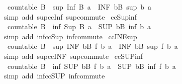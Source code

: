 \begin{isabellebody}
\ \ {\isachardoublequoteopen}countable\ B\ {\isasymLongrightarrow}\ sup\ {\isacharparenleft}Inf\ B{\isacharparenright}\ a\ {\isacharequal}\ {\isacharparenleft}INF\ b{\isasymin}B{\isachardot}\ sup\ b\ a{\isacharparenright}{\isachardoublequoteclose}\isanewline
%
\isadelimproof
\ \ %
\endisadelimproof
%
\isatagproof
{}\isamarkupfalse%
\ {\isacharparenleft}simp\ add{\isacharcolon}\ sup{\isacharunderscore}ccInf\ sup{\isacharunderscore}commute{\isacharparenright}%
\endisatagproof
{\isafoldproof}%
%
\isadelimproof
\isanewline
%
\endisadelimproof
\isanewline
{}\isamarkupfalse%
\ ccSup{\isacharunderscore}inf{\isacharcolon}\isanewline
\ \ {\isachardoublequoteopen}countable\ B\ {\isasymLongrightarrow}\ inf\ {\isacharparenleft}Sup\ B{\isacharparenright}\ a\ {\isacharequal}\ {\isacharparenleft}SUP\ b{\isasymin}B{\isachardot}\ inf\ b\ a{\isacharparenright}{\isachardoublequoteclose}\isanewline
%
\isadelimproof
\ \ %
\endisadelimproof
%
\isatagproof
{}\isamarkupfalse%
\ {\isacharparenleft}simp\ add{\isacharcolon}\ inf{\isacharunderscore}ccSup\ inf{\isacharunderscore}commute{\isacharparenright}%
\endisatagproof
{\isafoldproof}%
%
\isadelimproof
\isanewline
%
\endisadelimproof
\isanewline
{}\isamarkupfalse%
\ ccINF{\isacharunderscore}sup{\isacharcolon}\isanewline
\ \ {\isachardoublequoteopen}countable\ B\ {\isasymLongrightarrow}\ sup\ {\isacharparenleft}INF\ b{\isasymin}B{\isachardot}\ f\ b{\isacharparenright}\ a\ {\isacharequal}\ {\isacharparenleft}INF\ b{\isasymin}B{\isachardot}\ sup\ {\isacharparenleft}f\ b{\isacharparenright}\ a{\isacharparenright}{\isachardoublequoteclose}\isanewline
%
\isadelimproof
\ \ %
\endisadelimproof
%
\isatagproof
{}\isamarkupfalse%
\ {\isacharparenleft}simp\ add{\isacharcolon}\ sup{\isacharunderscore}ccINF\ sup{\isacharunderscore}commute{\isacharparenright}%
\endisatagproof
{\isafoldproof}%
%
\isadelimproof
\isanewline
%
\endisadelimproof
\isanewline
{}\isamarkupfalse%
\ ccSUP{\isacharunderscore}inf{\isacharcolon}\isanewline
\ \ {\isachardoublequoteopen}countable\ B\ {\isasymLongrightarrow}\ inf\ {\isacharparenleft}SUP\ b{\isasymin}B{\isachardot}\ f\ b{\isacharparenright}\ a\ {\isacharequal}\ {\isacharparenleft}SUP\ b{\isasymin}B{\isachardot}\ inf\ {\isacharparenleft}f\ b{\isacharparenright}\ a{\isacharparenright}{\isachardoublequoteclose}\isanewline
%
\isadelimproof
\ \ %
\endisadelimproof
%
\isatagproof
{}\isamarkupfalse%
\ {\isacharparenleft}simp\ add{\isacharcolon}\ inf{\isacharunderscore}ccSUP\ inf{\isacharunderscore}commute{\isacharparenright}%

\end{isabellebody}
